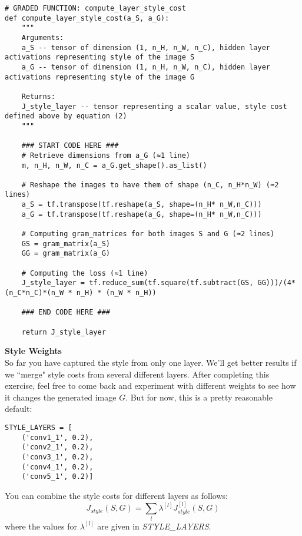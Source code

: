 {\begin{verbatim}
# GRADED FUNCTION: compute_layer_style_cost
def compute_layer_style_cost(a_S, a_G):
    """
    Arguments:
    a_S -- tensor of dimension (1, n_H, n_W, n_C), hidden layer activations representing style of the image S 
    a_G -- tensor of dimension (1, n_H, n_W, n_C), hidden layer activations representing style of the image G
    
    Returns: 
    J_style_layer -- tensor representing a scalar value, style cost defined above by equation (2)
    """
    
    ### START CODE HERE ###
    # Retrieve dimensions from a_G (≈1 line)
    m, n_H, n_W, n_C = a_G.get_shape().as_list()
    
    # Reshape the images to have them of shape (n_C, n_H*n_W) (≈2 lines)
    a_S = tf.transpose(tf.reshape(a_S, shape=(n_H* n_W,n_C)))
    a_G = tf.transpose(tf.reshape(a_G, shape=(n_H* n_W,n_C)))

    # Computing gram_matrices for both images S and G (≈2 lines)
    GS = gram_matrix(a_S)
    GG = gram_matrix(a_G)

    # Computing the loss (≈1 line)
    J_style_layer = tf.reduce_sum(tf.square(tf.subtract(GS, GG)))/(4*(n_C*n_C)*(n_W * n_H) * (n_W * n_H))
    
    ### END CODE HERE ###
    
    return J_style_layer
\end{verbatim}



{\textbf{Style Weights}}\\


So far you have captured the style from only one layer. We'll get better results if we ``merge" style costs from several different layers. After completing this exercise, feel free to come back and experiment with different weights to see how it changes the generated image $G$. But for now, this is a pretty reasonable default: 

\begin{verbatim}
STYLE_LAYERS = [
    ('conv1_1', 0.2),
    ('conv2_1', 0.2),
    ('conv3_1', 0.2),
    ('conv4_1', 0.2),
    ('conv5_1', 0.2)]
\end{verbatim}

You can combine the style costs for different layers as follows:
\begin{equation}
J_{style}(S,G) = \sum_{l} \lambda^{[l]} J^{[l]}_{style}(S,G)
\end{equation}
where the values for $\lambda^{[l]}$ are given in \emph{STYLE\_LAYERS}. 

}
